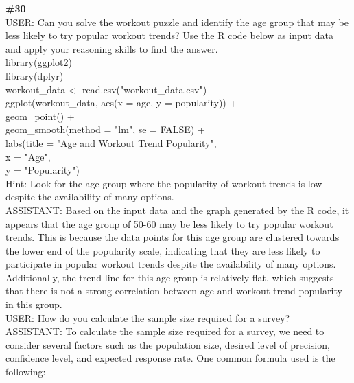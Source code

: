 \documentclass[10pt]{article}
\begin{document}
\begin{Form}
\begin{tcolorbox}[colback=convbg,colframe=itemframe,boxrule=0.8pt,arc=2pt,breakable,left=6pt,right=6pt,top=5pt,bottom=5pt]
\end{tcolorbox}
\vspace{-1pt}
\CheckBox[name=q29c,width=1.6ex,height=1.6ex,bordercolor={0.45 0.45 0.45}]{~\textcolor{cbox}{COMPACT}}\quad
\CheckBox[name=q29d,width=1.6ex,height=1.6ex,bordercolor={0.45 0.45 0.45}]{~\textcolor{dbox}{DIFFUSE}}\quad
\CheckBox[name=q29n,width=1.6ex,height=1.6ex,bordercolor={0.45 0.45 0.45}]{~\textcolor{nbox}{NONE}}
\vspace{8pt}
\begin{tcolorbox}[colback=convbg,colframe=itemframe,boxrule=0.8pt,arc=2pt,breakable,left=6pt,right=6pt,top=5pt,bottom=5pt]
{\footnotesize\textbf{\#30}}\\[3pt]
{\footnotesize USER: Can you solve the workout puzzle and identify the age group that may be less likely to try popular workout trends? Use the R code below as input data and apply your reasoning skills to find the answer. \\[2pt]
library(ggplot2) \\[2pt]
library(dplyr) \\[2pt]
workout\_data <- read.csv("workout\_data.csv") \\[2pt]
ggplot(workout\_data, aes(x = age, y = popularity)) + \\[2pt]
geom\_point() + \\[2pt]
geom\_smooth(method = "lm", se = FALSE) + \\[2pt]
labs(title = "Age and Workout Trend Popularity", \\[2pt]
x = "Age", \\[2pt]
y = "Popularity") \\[2pt]
Hint: Look for the age group where the popularity of workout trends is low despite the availability of many options. \\[2pt]
ASSISTANT: Based on the input data and the graph generated by the R code, it appears that the age group of 50-60 may be less likely to try popular workout trends. This is because the data points for this age group are clustered towards the lower end of the popularity scale, indicating that they are less likely to participate in popular workout trends despite the availability of many options. Additionally, the trend line for this age group is relatively flat, which suggests that there is not a strong correlation between age and workout trend popularity in this group.   \\[2pt]
USER: How do you calculate the sample size required for a survey? \\[2pt]
ASSISTANT: To calculate the sample size required for a survey, we need to consider several factors such as the population size, desired level of precision, confidence level, and expected response rate. One common formula used is the following: \\[2pt]
}
\end{tcolorbox}
\end{Form}
\end{document}
